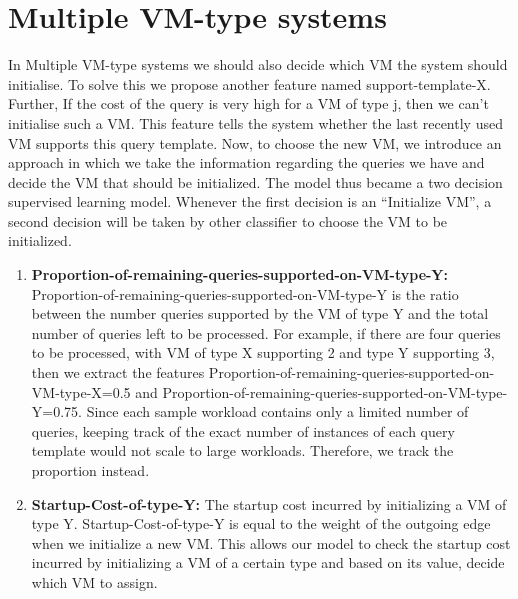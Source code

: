 \section{Multiple VM-type systems}
In Multiple VM-type systems we should also decide which VM the system should initialise. To solve this we propose another feature named support-template-X. Further, If the cost of the query is very high for a VM of type j, then we can’t initialise such a VM. This feature tells the system whether the last recently used VM supports this query template.  Now, to choose the new VM, we introduce an approach in which we take the information regarding the queries we have and decide the VM that should be initialized. The model thus became a two decision supervised learning model. Whenever the first decision is an “Initialize VM”, a second decision will be taken by other classifier to choose the VM to be initialized. 

\begin{enumerate}
\item \textbf{Proportion-of-remaining-queries-supported-on-VM-type-Y:}\\
Proportion-of-remaining-queries-supported-on-VM-type-Y is the ratio between the number queries supported by the VM of type Y and the total number of queries left to be processed. For example, if there are four queries to be processed, with VM of type X supporting 2 and type Y supporting 3, then we extract the features Proportion-of-remaining-queries-supported-on-VM-type-X=0.5 and Proportion-of-remaining-queries-supported-on-VM-type-Y=0.75. Since each sample workload contains only a limited number of queries, keeping track of the exact number of instances of each query template would not scale to large workloads. Therefore, we track the proportion instead.
\item \textbf{Startup-Cost-of-type-Y:} The startup cost incurred by initializing a VM of type Y. Startup-Cost-of-type-Y is equal to the weight of the outgoing edge when we initialize a new VM. This allows our model to check the startup cost incurred by initializing a VM of a certain type and based on its value, decide which VM to assign.
\end {enumerate}